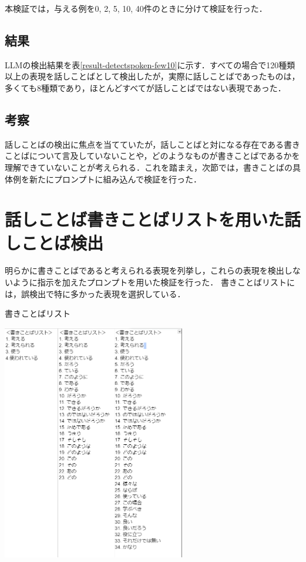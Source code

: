 本検証では，与える例を0, 2, 5, 10, 40件のときに分けて検証を行った．

\subsection{結果}
LLMの検出結果を表\ref{result-detectspoken-few10}に示す．すべての場合で120種類以上の表現を話しことばとして検出したが，実際に話しことばであったものは，多くても8種類であり，ほとんどすべてが話しことばではない表現であった．



\subsection{考察}
話しことばの検出に焦点を当てていたが，話しことばと対になる存在である書きことばについて言及していないことや，どのようなものが書きことばであるかを理解できていないことが考えられる．これを踏まえ，次節では，書きことばの具体例を新たにプロンプトに組み込んで検証を行った．

\section{話しことば書きことばリストを用いた話しことば検出}
明らかに書きことばであると考えられる表現を列挙し，これらの表現を検出しないように指示を加えたプロンプトを用いた検証を行った．
書きことばリストには，誤検出で特に多かった表現を選択している．

\begin{table}[H]
	\centering
        \caption{書きことばリスト}
 	\includegraphics[width=80mm]{image/image-klistTable.png}
	\label{klistTable}
\end{table}

